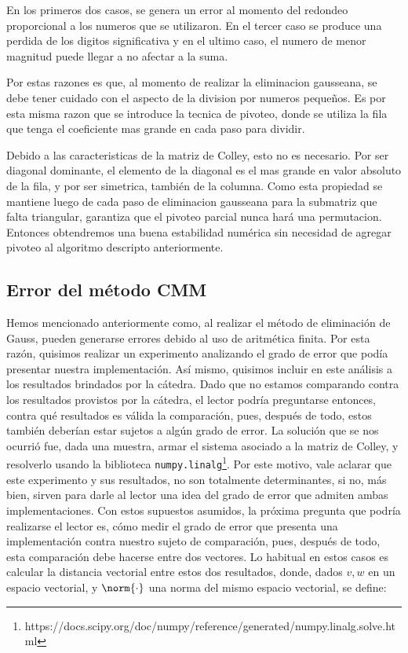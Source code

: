 \documentclass[a4paper]{article}
\begin{document}
En los primeros dos casos, se genera un error al momento del redondeo proporcional a los numeros que se utilizaron. En el tercer caso se produce una perdida de los digitos significativa y en el ultimo caso, el numero de menor magnitud puede llegar a no afectar a la suma.

Por estas razones es que, al momento de realizar la eliminacion gausseana, se debe tener cuidado con el aspecto de la division por numeros pequeños. Es por esta misma razon que se introduce la tecnica de pivoteo, donde se utiliza la fila que tenga el coeficiente mas grande en cada paso para dividir.

Debido a las caracteristicas de la matriz de Colley, esto no es necesario. Por ser diagonal dominante, el elemento de la diagonal es el mas grande en valor absoluto de la fila, y por ser simetrica, también de la columna. Como esta propiedad se mantiene luego de cada paso de eliminacion gausseana para la submatriz que falta triangular, garantiza que el pivoteo parcial nunca hará una permutacion. Entonces obtendremos una buena estabilidad numérica sin necesidad de agregar pivoteo al algoritmo descripto anteriormente.

\subsection{Error del método CMM}

Hemos mencionado anteriormente como, al realizar el método de eliminación de Gauss, pueden generarse errores debido al uso de aritmética finita. Por esta razón, quisimos realizar un experimento analizando el grado de error que podía presentar nuestra implementación. Así mismo, quisimos incluir en este análisis a los resultados brindados por la cátedra. Dado que no estamos comparando contra los resultados provistos por la cátedra, el lector podría preguntarse entonces, contra qué resultados es válida la comparación, pues, después de todo, estos también deberían estar sujetos a algún grado de error. La solución que se nos ocurrió fue, dada una muestra, armar el sistema asociado a la matriz de Colley, y resolverlo usando la biblioteca \texttt{numpy.linalg}\footnote{https://docs.scipy.org/doc/numpy/reference/generated/numpy.linalg.solve.html}. Por este motivo, vale aclarar que este experimento y sus resultados, no son totalmente determinantes, si no, más bien, sirven para darle al lector una idea del grado de error que admiten ambas implementaciones.
Con estos supuestos asumidos, la próxima pregunta que podría realizarse el lector es, cómo medir el grado de error que presenta una implementación contra nuestro sujeto de comparación, pues, después de todo, esta comparación debe hacerse entre dos vectores. Lo habitual en estos casos es calcular la distancia vectorial entre estos dos resultados, donde, dados $v,w$ en un espacio vectorial, y $\norm{\cdot}$ una norma del mismo espacio vectorial, se define:
\end{document}
